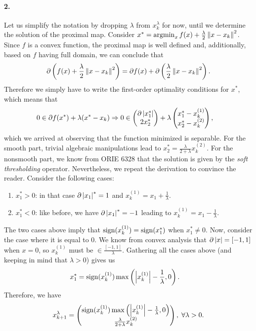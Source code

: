 \documentclass[10pt]{article}
\begin{document}
\begin{Exercise}
    \paragraph{2.}
		Let us simplify the notation by dropping $\lambda$ from $x_k^{\lambda}$
		for now, until we determine the solution of the proximal map.
		Consider $x^* = \operatorname*{argmin}_{x} f(x) + \frac{\lambda}{2} \left \| x - x_k \right \|^2$.
		Since $f$ is a convex function, the proximal map is well defined and,
		additionally, based on $f$ having full domain, we can conclude that
		\[
			\partial \left(f(x) + \frac{\lambda}{2} \left \| x - x_k \right \|^2 \right)
			= \partial f(x) + \partial \left( \frac{\lambda}{2} \left \| x -
			x_k \right \|^2 \right).
		\]
		Therefore we simply have to write the first-order optimality conditions
		for $x^*$, which means that
		\begin{align*}
			0 &\in \partial f(x^*) + \lambda ( x^* - x_k ) \Rightarrow
			0 \in \begin{pmatrix} \partial \left| x^*_1 \right| \\ 2 x^*_2 \end{pmatrix}
				+ \lambda \begin{pmatrix} x^*_1 - x_k^{(1)} \\ x^*_2 - x_k^{(2)}
				\end{pmatrix},
		\end{align*}
		which we arrived at observing that the function minimized is separable.
		For the smooth part, trivial algebraic manipulations lead to $x_2^* =
		\frac{\lambda}{2 + \lambda} x_k^{(2)}$. For the nonsmooth part, we
		know from ORIE 6328 that the solution is given by the
		\textit{soft thresholding} operator. Nevertheless, we repeat the
		derivation to convince the reader. Consider the following cases:
		\begin{enumerate}
			\item $x^*_1 > 0$: in that case $\partial \left| x_1 \right|^* = 1$ and
				$x_k^{(1)} = x_1 + \frac{1}{\lambda}$.
			\item $x^*_1 < 0$: like before, we have $\partial \left| x_1 \right|^* = -1$
				leading to $x_k^{(1)} = x_1 - \frac{1}{\lambda}$.
		\end{enumerate}
		The two cases above imply that $\mathrm{sign}(x_k^{(1)}) = \mathrm{sign}(x_1^*)$ when
		$x_1^* \neq 0$. Now, consider the case where it is equal to $0$. We
		know from convex analysis that $\partial \left| x \right| = [-1, 1]$ when
		$x = 0$, so $x_k^{(1)}$ must be $\in \frac{[-1, 1]}{\lambda}$. Gathering all the
		cases above (and keeping in mind that $\lambda > 0$) gives us
		\begin{align*}
			x_1^* &= \mathrm{sign}(x_k^{(1)}) \max\left(\left| x_k^{(1)} \right| -
				\frac{1}{\lambda}, 0\right).
		\end{align*}
		Therefore, we have
		\[
			x_{k+1}^{\lambda} = \begin{pmatrix}
				\mathrm{sign}(x_k^{(1)}) \max\left( \left| x_k^{(1)} \right| -
				\frac{1}{\lambda}, 0 \right) \\
				\frac{\lambda}{2 + \lambda} x_k^{(2)}
			\end{pmatrix}, \; \forall \lambda > 0.
		\]


\end{Exercise}
\end{document}
